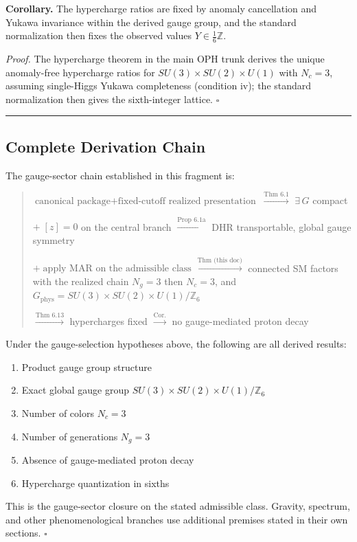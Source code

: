 \textbf{Corollary.} The hypercharge ratios are fixed by anomaly cancellation and Yukawa invariance within the derived gauge group, and the standard normalization then fixes the observed values \(Y \in \frac{1}{6}\mathbb{Z}\).

\emph{Proof.} The hypercharge theorem in the main OPH trunk derives the unique anomaly-free hypercharge ratios for \(SU(3) \times SU(2) \times U(1)\) with \(N_c = 3\), assuming single-Higgs Yukawa completeness (condition iv); the standard normalization then gives the sixth-integer lattice. \(\square\)

\begin{center}\rule{0.5\linewidth}{0.5pt}\end{center}

\subsection{Complete Derivation Chain}\label{9-complete-derivation-chain}

The gauge-sector chain established in this fragment is:

\begin{quote}
\(\text{canonical package} + \text{fixed-cutoff realized presentation}\) \(\xrightarrow{\text{Thm 6.1}}\) \(\exists\, G\) compact

\(+ \; [z]=0\) on the central branch \(\xrightarrow{\text{Prop 6.1a}}\) DHR transportable, global gauge symmetry

\(+ \;\text{apply MAR on the admissible class}\) \(\xrightarrow{\text{Thm (this doc)}}\) connected SM factors with the realized chain \(N_g = 3\) then \(N_c = 3\), and \(G_{\mathrm{phys}} = SU(3) \times SU(2) \times U(1)/\mathbb{Z}_6\)

\(\xrightarrow{\text{Thm 6.13}}\) hypercharges fixed \(\xrightarrow{\text{Cor.}}\) no gauge-mediated proton decay
\end{quote}

Under the gauge-selection hypotheses above, the following are all derived results:

\begin{enumerate}
\def\labelenumi{\arabic{enumi}.}
\tightlist
\item
  Product gauge group structure
\item
  Exact global gauge group \(SU(3) \times SU(2) \times U(1)/\mathbb{Z}_6\)
\item
  Number of colors \(N_c = 3\)
\item
  Number of generations \(N_g = 3\)
\item
  Absence of gauge-mediated proton decay
\item
  Hypercharge quantization in sixths
\end{enumerate}

This is the gauge-sector closure on the stated admissible class. Gravity, spectrum, and other phenomenological branches use additional premises stated in their own sections. \(\square\)
